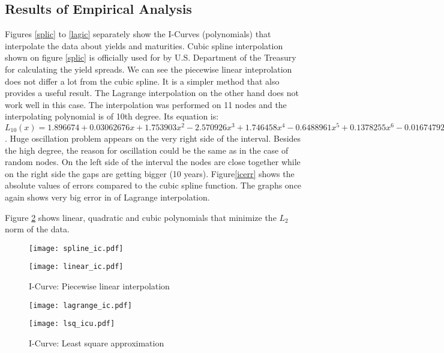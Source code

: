 \documentclass[a4paper,10pt]{article}
\begin{document}
\subsection{Results of Empirical Analysis}
Figures \ref{splic} to \ref{lagic} separately show the I-Curves (polynomials) that interpolate the data about yields and maturities.
Cubic spline interpolation shown on figure \ref{splic} is officially used for by U.S. Department of the Treasury for calculating the yield spreads.
We can see the piecewise linear inteprolation does not differ a lot from the cubic spline. It is a simpler method that also provides a useful result.
The Lagrange interpolation on the other hand does not work well in this case. The interpolation was performed on 11 nodes and the interpolating polynomial is 
of 10th degree. Its equation is: $L_{10}(x)=1.896674 + 0.03062676x + 1.753903x^2 - 2.570926x^3 + 1.746458x^4 - 0.6488961x^5 + 0.1378255x^6 - 0.01674792x^7 + 0.001119937x^8 -  
3.723101e-05x^9 + 4.712203e-07x^10$.
Huge oscillation problem appears on the very right side of the interval. Besides the high degree, the reason for oscillation could be the same as in the case of random nodes.
On the left side of the interval the nodes are close together while on the right side the gaps are getting bigger (10 years).
Figure\ref{icerr} shows the absolute values of errors compared to the cubic spline function. The graphs once again shows very big error in of Lagrange interpolation.

Figure \ref{lsqic} shows linear, quadratic and cubic polynomials that minimize the $L_2$ norm of the data.

\begin{figure}[h!]
        \begin{minipage}[b]{0.5\linewidth}
            \centering
            \texttt{[image: spline\_ic.pdf]}
            \caption{I-Curve: Cubic spline interpolation}
            \label{splic}
        \end{minipage}
        \hspace{0.5cm}
        \begin{minipage}[b]{0.5\linewidth}
            \centering
            \texttt{[image: linear\_ic.pdf]}
            \caption{I-Curve: Piecewise linear interpolation}
            \label{linic}
        \end{minipage}
    \end{figure}

\begin{figure}[h!]
        \begin{minipage}[b]{0.5\linewidth}
            \centering
            \texttt{[image: lagrange\_ic.pdf]}
            \caption{I-Curve: Lagrange interpolation}
            \label{lagic}
        \end{minipage}
        \hspace{0.5cm}
        \begin{minipage}[b]{0.5\linewidth}
            \centering
            \texttt{[image: lsq\_icu.pdf]}
            \caption{I-Curve: Least square approximation}
            \label{lsqic}
        \end{minipage}
    \end{figure}
\end{document}
